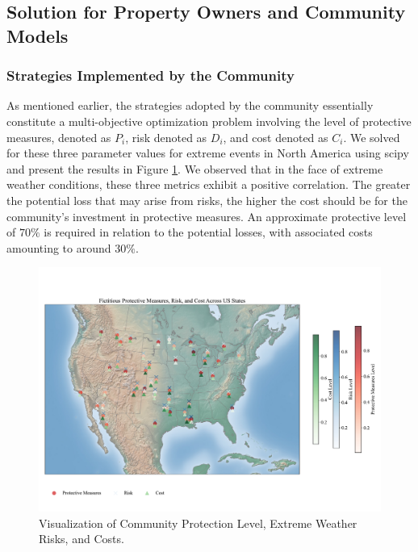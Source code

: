 \documentclass[12pt]{article}
\begin{document}
\subsection{Solution for Property Owners and Community Models}
\subsubsection{Strategies Implemented by the Community}
As mentioned earlier, the strategies adopted by the community essentially constitute a multi-objective optimization problem involving the level of protective measures, denoted as $P_i$, risk denoted as $D_i$, and cost denoted as $C_i$. We solved for these three parameter values for extreme events in North America using scipy and present the results in Figure \ref{social}. We observed that in the face of extreme weather conditions, these three metrics exhibit a positive correlation. The greater the potential loss that may arise from risks, the higher the cost should be for the community's investment in protective measures. An approximate protective level of $70 \%$ is required in relation to the potential losses, with associated costs amounting to around $30 \%$.

\begin{figure}[htbp]
    \centering
    \includegraphics[width=0.8\linewidth]{figure/risk.pdf}
    \caption{Visualization of Community Protection Level, Extreme Weather Risks, and Costs.}
    \label{social}
\end{figure}
\end{document}
